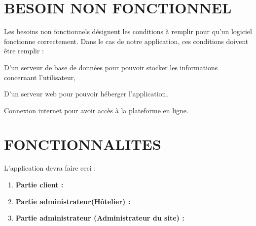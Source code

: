 \section{BESOIN NON FONCTIONNEL}
Les besoins non fonctionnels désignent les conditions à remplir pour qu’un logiciel fonctionne correctement. Dans le cas de notre application, ces conditions doivent être remplir :
\begin{list}{•}{ }
   \item D’un serveur de base de données pour pouvoir stocker les informations concernant l’utilisateur,
   \item D’un serveur web pour pouvoir héberger l’application,
   \item Connexion internet pour avoir accès à la plateforme en ligne.
\end{list}

\section{FONCTIONNALITES}
L’application devra faire ceci :
\begin{enumerate}
  \item \textbf{Partie client :}
  \item \textbf{Partie administrateur(Hôtelier) :}
  \item \textbf{Partie administrateur (Administrateur du site) :}
\end{enumerate}


